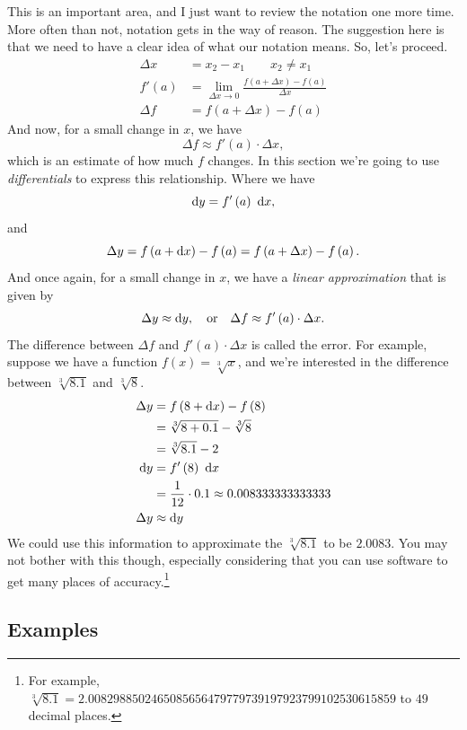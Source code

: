 \documentclass[12pt,addpoints, answers, fleqn]{exam}
\begin{document}
This is an important area, and I just want to review the notation one more time. More often than not, notation gets in the way of reason. The suggestion here is that we need to have a clear idea of what our notation means. So, let's proceed.
\begin{align}
\Delta x &= x_2 - x_1 \qquad x_2 \neq x_1\\
f'\left( a \right) &= \lim_{\Delta x \to 0} \frac{f\left( a +  \Delta x \right)-f\left( a \right)}{\Delta x}\\
\Delta f &= f\left( a +  \Delta x \right)-f\left( a \right)
\end{align}
And now, for a small change in $x$, we have
\[
\Delta f \approx f'\left( a \right) \cdot \Delta x,
\]
which is an estimate of how much $f$ changes. In this section we're going to use \emph{differentials} to express this relationship. Where we have
\[
{\rm{d}} y =  f'\left( a \right) \ {\rm{d}} x,
\]
and
\[
\Delta y = f \left( a + {\rm{d}} x\right) - f \left( a \right)= f \left( a + \Delta x\right) - f \left( a \right).
\]
And once again, for a small change in $x$, we have a \emph{linear approximation} that is given by
\[
\Delta y \approx {\rm{d}} y, \quad  \text{or}  \quad \Delta f \approx f' \left( a \right) \cdot \Delta x.
\]
The difference between $\Delta f$ and $f'\left( a \right) \cdot \Delta x$ is called the error. For example, suppose we have a function $f \left( x \right) = \sqrt[3]{x}$, and we're interested in the difference between $\sqrt[3]{8.1}$ and  $\sqrt[3]{8}$.
\begin{align}
\Delta y &= f \left( 8 + {\rm{d}} x\right) - f \left( 8 \right)\\
 &= \sqrt[3]{8 + 0.1} - \sqrt[3]{8}\\
  &= \sqrt[3]{8.1} - 2\\
{\rm{d}} y &=  f'\left( 8 \right) \ {\rm{d}} x\\
&= \frac{1}{12} \cdot 0.1 \approx 0.008333333333333\\
\Delta y &\approx {\rm{d}} y
\end{align}
We could use this information to approximate the $\sqrt[3]{8.1}$ to be $2.0083$. You may not bother with this though, especially considering that you can use software to get many places of accuracy.\footnote{For example, $\sqrt[3]{8.1}=2.0082988502465085656479779739197923799102530615859$ to $49$ decimal places.}



\subsection{Examples}
\end{document}
